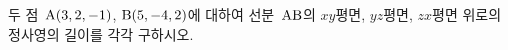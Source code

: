 두 점~$\mathrm{A}(3{,}\mkern3mu\mathopen{}2{,}\mkern3mu\mathopen{}-1)$, $\mathrm{B}(5{,}\mkern3mu\mathopen{}-4{,}\mkern3mu\mathopen{}2)$에 대하여 선분~$\mathrm{AB}$의 $xy$평면, $yz$평면, $zx$평면 위로의 정사영의 길이를 각각 구하시오.
